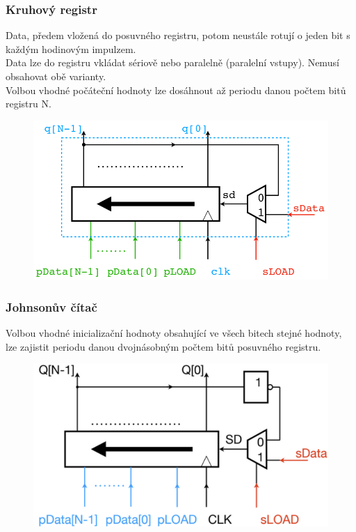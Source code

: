 \subsubsection{Kruhový registr}
Data, předem vložená do posuvného registru, potom neustále rotují o jeden bit s každým hodinovým impulzem.\\
Data lze do registru vkládat sériově nebo paralelně (paralelní vstupy). Nemusí obsahovat obě varianty.\\
Volbou vhodné počáteční hodnoty lze dosáhnout až periodu danou počtem bitů registru N.\\
\begin{figure}[h!]
    \centering
    \includegraphics[scale = 0.4]{img/KruhCt.png}
\end{figure}

\subsubsection{Johnsonův čítač}
Volbou vhodné inicializační hodnoty obsahující ve všech bitech stejné hodnoty, lze zajistit periodu danou dvojnásobným počtem bitů posuvného registru.
\begin{figure}[h!]
    \centering
    \includegraphics[scale = 0.4]{img/Johnson.png}
\end{figure}

